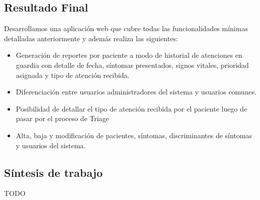 \subsection{Resultado Final}
Desarrollamos una aplicación web que cubre todas las funcionalidades mínimas detalladas anteriormente y además realiza las siguientes:
\begin{itemize}
\item Generación de reportes por paciente a modo de historial de atenciones en guardia con detalle de fecha, síntomas presentados, signos vitales, prioridad asignada y tipo de atención recibida.
\item Diferenciación entre usuarios administradores del sistema y usuarios comunes.
\item Posibilidad de detallar el tipo de atención recibida por el paciente luego de pasar por el proceso de Triage
\item Alta, baja y modificación de pacientes, síntomas, discriminantes de síntomas y usuarios del sistema.
\end{itemize}
\subsection{Síntesis de trabajo}
TODO
